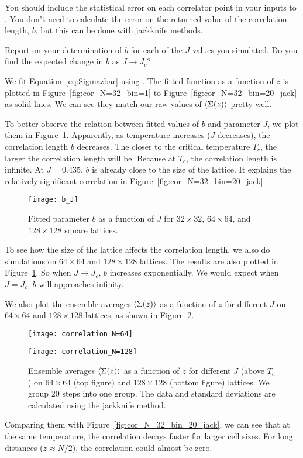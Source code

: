 You should include the statistical error on each correlator point in your inputs to
.
You don't need to calculate the error on the returned value of the correlation length,
\(b\), but this can be done with jackknife methods.

Report on your determination of \(b\) for each of the \(J\) values you
simulated. Do you find the expected change in \(b\) as \(J \rightarrow J_c\)?

\Answer{}
We fit Equation~\eqref{eq:Sigmazbar} using .
The fitted function as a function of \(z\) is plotted in Figure~\ref{fig:cor_N=32_bin=1}
to Figure~\ref{fig:cor_N=32_bin=20_jack} as solid lines.
We can see they match our raw values of \(\expval{\Sigma(z)}\) pretty well.

To better observe the relation between fitted values of \(b\) and parameter \(J\),
we plot them in Figure~\ref{fig:b_J}.
Apparently, as temperature increases (\(J\) decreases), the correlation length \(b\)
decreases. The closer to the critical temperature \(T_c\), the larger the correlation
length will be. Because at \(T_c\), the correlation length is infinite.
At \(J = 0.435\), \(b\) is already close to the size of the lattice.
It explains the relatively significant correlation in Figure~\ref{fig:cor_N=32_bin=20_jack}.

\begin{figure}[hb]
    \centering
    \texttt{[image: b\_J]}
    \caption{Fitted parameter \(b\) as a function of \(J\) for \(32 \times 32\),
        \(64 \times 64\), and \(128 \times 128\) square lattices.}
    \label{fig:b_J}
\end{figure}

To see how the size of the lattice affects the correlation length, we also do simulations
on \(64 \times 64\) and \(128 \times 128\) lattices.
The results are also plotted in Figure~\ref{fig:b_J}.
So when \(J \to J_c\), \(b\) increases exponentially. We would expect
when \(J = J_c\), \(b\) will approaches infinity.

We also plot the ensemble averages \(\expval{\Sigma(z)}\) as a function of \(z\) for
different \(J\) on \(64 \times 64\) and \(128 \times 128\) lattices, as shown in
Figure~\ref{fig:corr_N}.

\begin{figure}
    \centering
    \begin{minipage}[t]{0.9\linewidth}
        \centering
        \texttt{[image: correlation\_N=64]}
    \end{minipage}
    \hfill
    \begin{minipage}[t]{0.9\linewidth}
        \centering
        \texttt{[image: correlation\_N=128]}
    \end{minipage}
    \caption{Ensemble averages \(\expval{\Sigma(z)}\) as a function of \(z\) for different
        \(J\) (above \(T_c\)) on \(64 \times 64\) (top figure) and \(128 \times 128\)
        (bottom figure) lattices. We group \(20\) steps into one group. The data and
        standard deviations are calculated using the jackknife method.}
    \label{fig:corr_N}
\end{figure}

Comparing them with Figure~\ref{fig:cor_N=32_bin=20_jack}, we can see that
at the same temperature, the correlation decays faster for larger cell sizes.
For long distances (\(z \approx N / 2\)), the correlation could almost be zero.
